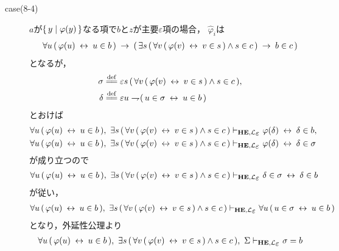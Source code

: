 \begin{metaprf}
\begin{description}
\begin{description}
					\item[case(8-4)] $a$が$\{\, y \mid \varphi(y)\, \}$なる項で$b$と$z$が主要$\varepsilon$項の場合，
						$\widehat{\varphi}_{i}$は
						\begin{align}
							\forall u\, (\, \varphi(u) \hspace{0.25em}\leftrightarrow\hspace{0.25em} u \in b\, ) 
							\hspace{0.25em}\rightarrow\hspace{0.25em} (\, \exists s\, (\, \forall v\, (\, \varphi(v) \hspace{0.25em}\leftrightarrow\hspace{0.25em} v \in s\, ) \wedge s \in c\, )
							\hspace{0.25em}\rightarrow\hspace{0.25em} b \in c\, )
						\end{align}
						となるが，
						\begin{align}
							\sigma &\defeq \varepsilon s\, (\, \forall v\, (\, \varphi(v) \lrarrow v \in s\, ) \wedge s \in c\, ), \\
							\delta &\defeq \varepsilon u \negation (\, u \in \sigma \lrarrow u \in b\, )
						\end{align}
						とおけば
						\begin{align}
							\forall u\, (\, \varphi(u) \lrarrow u \in b\, ),\ 
							\exists s\, (\, \forall v\, (\, \varphi(v) \lrarrow v \in s\, ) \wedge s \in c\, )
							&\provable{\mbox{{\bf HE}},\lang{\varepsilon}} \varphi(\delta) \lrarrow \delta \in b, \\
							\forall u\, (\, \varphi(u) \lrarrow u \in b\, ),\ 
							\exists s\, (\, \forall v\, (\, \varphi(v) \lrarrow v \in s\, ) \wedge s \in c\, )
							&\provable{\mbox{{\bf HE}},\lang{\varepsilon}} \varphi(\delta) \lrarrow \delta \in \sigma
						\end{align}
						が成り立つので
						\begin{align}
							\forall u\, (\, \varphi(u) \lrarrow u \in b\, ),\ 
							\exists s\, (\, \forall v\, (\, \varphi(v) \lrarrow v \in s\, ) \wedge s \in c\, )
							\provable{\mbox{{\bf HE}},\lang{\varepsilon}} \delta \in \sigma \lrarrow \delta \in b
						\end{align}
						が従い，
						\begin{align}
							\forall u\, (\, \varphi(u) \lrarrow u \in b\, ),\ 
							\exists s\, (\, \forall v\, (\, \varphi(v) \lrarrow v \in s\, ) \wedge s \in c\, )
							\provable{\mbox{{\bf HE}},\lang{\varepsilon}} \forall u\, (\, u \in \sigma \lrarrow u \in b\, )
						\end{align}
						となり，外延性公理より
						\begin{align}
							\forall u\, (\, \varphi(u) \lrarrow u \in b\, ),\ 
							\exists s\, (\, \forall v\, (\, \varphi(v) \lrarrow v \in s\, ) \wedge s \in c\, ),\ 
							\Sigma
							\provable{\mbox{{\bf HE}},\lang{\varepsilon}} \sigma = b
						\end{align}

\end{description}
\end{description}
\end{metaprf}
